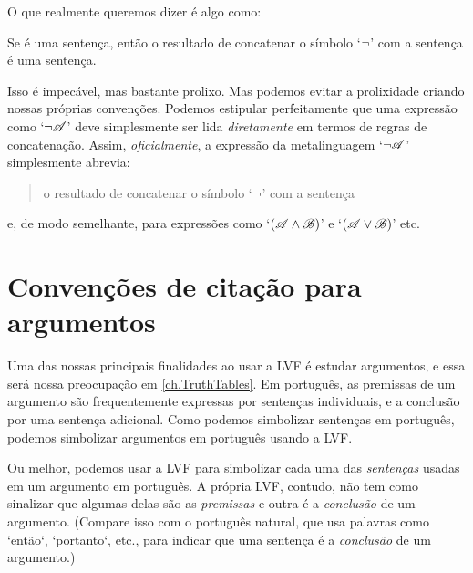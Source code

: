 O que realmente queremos dizer é algo como:
	\begin{numberlist}
		\item[2$'''$.] Se  é uma sentença, então o resultado de concatenar o símbolo `$\neg$' com a sentença  é uma sentença.
	\end{numberlist}
Isso é impecável, mas bastante prolixo. %
Mas podemos evitar a prolixidade criando nossas próprias convenções. Podemos
estipular perfeitamente que uma expressão como `$\neg \mathscr{A}$' deve
simplesmente ser lida \emph{diretamente} em termos de regras de concatenação.
Assim, \emph{oficialmente}, a expressão da metalinguagem `$\neg \mathscr{A}$'
simplesmente abrevia:
\begin{quote}
	o resultado de concatenar o símbolo `$\neg$' com a sentença 
\end{quote}
e, de modo semelhante, para expressões como
`$(\mathscr{A} \wedge \mathscr{B})$' e `$(\mathscr{A} \vee \mathscr{B})$' etc.


\section{Convenções de citação para argumentos}
Uma das nossas principais finalidades ao usar a LVF é estudar argumentos, e
essa será nossa preocupação em \cref{ch.TruthTables}. Em português, as
premissas de um argumento são frequentemente expressas por sentenças
individuais, e a conclusão por uma sentença adicional. Como podemos
simbolizar sentenças em português, podemos simbolizar argumentos em
português usando a LVF.

Ou melhor, podemos usar a LVF para simbolizar cada uma das \emph{sentenças}
usadas em um argumento em português. A própria LVF, contudo, não tem como
sinalizar que algumas delas são as \emph{premissas} e outra é a
\emph{conclusão} de um argumento. (Compare isso com o português natural,
que usa palavras como `então`, `portanto`, etc., para indicar
que uma sentença é a \emph{conclusão} de um argumento.)

